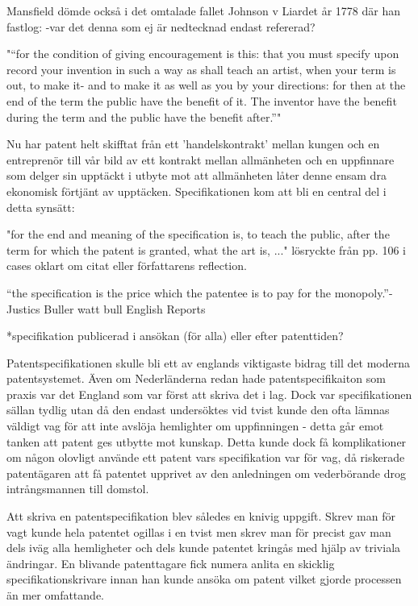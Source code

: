 Mansfield dömde också i det omtalade fallet Johnson v Liardet år 1778 där han fastlog:
 -var det denna som ej är nedtecknad endast refererad?

"“for the condition of giving encouragement is this: that 
you must specify upon record your invention in such a 
way as shall teach an artist, when your term is out, to 
make it- and to make it as well as you by your directions: 
for then at the end of the term the public have the benefit 
of it. The inventor have the benefit during the term and 
the public have the benefit after.”" \cite{hulme}

Nu har patent helt skifftat från ett 'handelskontrakt' mellan kungen och en entreprenör till vår bild av ett kontrakt mellan allmänheten och en uppfinnare som delger sin upptäckt i utbyte mot att allmänheten låter denne ensam dra ekonomisk förtjänt av upptäcken. Specifikationen kom att bli en central del i detta synsätt: 

"for the end and meaning of the specification is, to teach the public, after the term for which the patent is granted, what the art is, ..." \cite{cases-davies} lösryckte från pp. 106 i cases oklart om citat eller författarens reflection.


“the specification is the price which 
the patentee is to pay for the monopoly.”-Justics Buller watt bull \cite{2 H. Bl. 463, 472, 126 Eng. Rep. 651, 656 (C.P. 1795)} English Reports

*specifikation publicerad i ansökan (för alla) eller efter patenttiden?

Patentspecifikationen skulle bli ett av englands viktigaste bidrag till det
moderna patentsystemet. Även om
Nederländerna redan hade patentspecifikaiton som praxis var det England som var först att skriva det i
lag. \cite{macleod} Dock var specifikationen sällan tydlig utan då den endast undersöktes vid tvist
kunde den ofta lämnas väldigt vag för att inte avslöja hemlighter om uppfinningen - detta går emot tanken
att patent ges utbytte mot kunskap. Detta kunde dock få komplikationer om någon olovligt använde ett
patent vars specifikation var för vag, då riskerade patentägaren att få patentet upprivet av den anledningen om vederbörande drog intrångsmannen till domstol.

Att skriva en patentspecifikation blev således en knivig uppgift. Skrev man för vagt kunde hela patentet
ogillas i en tvist men skrev man för precist gav man dels iväg alla hemligheter och dels kunde patentet
kringås med hjälp av triviala ändringar\cite{macleod}. En
blivande patenttagare fick numera anlita en skicklig specifikationskrivare innan han kunde ansöka om
patent vilket gjorde processen än mer omfattande\cite{macleod}.

